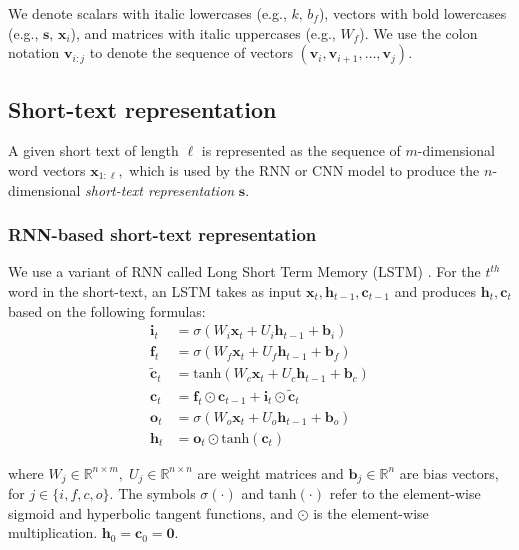 \documentclass[11pt,letterpaper]{article}
\begin{document}
We denote scalars with italic lowercases (e.g., $k,\, b_f$), vectors with bold lowercases (e.g., $\mathbf{s},\, \mathbf{x}_i$), and matrices with italic uppercases (e.g., $W_f$).
We use the colon notation $\mathbf{v}_{i:j}$ to denote the sequence of vectors $(\mathbf{v}_i, \mathbf{v}_{i+1}, \dotsc, \mathbf{v}_j)$.


\subsection{Short-text representation} \label{sec:representation}
A given short text of length $\ell$ is represented as the sequence of $m$-dimensional word vectors $\mathbf{x}_{1:\ell},$ which is used by the RNN or CNN model to produce the $n$-dimensional \textit{short-text representation} $\mathbf{s}.$   

\subsubsection{RNN-based short-text representation} \label{sec:rnn}
\noindent We use a variant of RNN called Long Short Term Memory (LSTM) \cite{hochreiter1997long}.
For the $t^{th}$ word in the short-text, an LSTM takes as input $\mathbf{x}_t, \mathbf{h}_{t-1}, \mathbf{c}_{t-1}$ and produces $\mathbf{h}_t, \mathbf{c}_t$ based on the following formulas:
\begin{align*}
\mathbf{i}_t &= \sigma(W_i \mathbf{x}_t + U_i \mathbf{h}_{t-1} + \mathbf{b}_i) \\
\mathbf{f}_t &= \sigma(W_f \mathbf{x}_t + U_f \mathbf{h}_{t-1} + \mathbf{b}_f) \\
\tilde{\mathbf{c}}_t &= \text{tanh}(W_c \mathbf{x}_t + U_c \mathbf{h}_{t-1} + \mathbf{b}_c) \\
\mathbf{c}_t &= \mathbf{f}_t \odot \mathbf{c}_{t-1} + \mathbf{i}_t \odot \tilde{\mathbf{c}}_t \\
\mathbf{o}_t &= \sigma(W_o \mathbf{x}_t + U_o \mathbf{h}_{t-1} + \mathbf{b}_o) \\
\mathbf{h}_t &= \mathbf{o}_t \odot \text{tanh}(\mathbf{c}_t) 
\end{align*}

\noindent where $W_j \in \mathbb{R}^{n \times m}, \; U_j \in \mathbb{R}^{n \times n}$ are weight matrices and $ \mathbf{b}_j \in \mathbb{R}^n$ are bias vectors, for $j \in \{i, f, c, o\}$.
The symbols $\sigma(\cdot)$ and tanh$(\cdot)$ refer to the element-wise sigmoid and hyperbolic tangent functions, and $\odot$ is the element-wise multiplication. $\mathbf{h}_0 = \mathbf{c}_0 = \mathbf{0}$.
\end{document}

